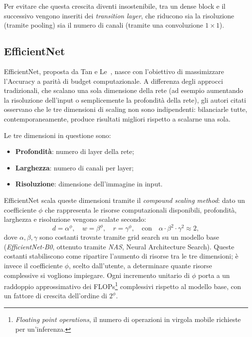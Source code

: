 Per evitare che questa crescita diventi insostenibile, tra un dense block e il successivo vengono inseriti dei \emph{transition layer}, che riducono sia la risoluzione (tramite pooling) sia il numero di canali (tramite una convoluzione $1\times1$).

\clearpage
\subsection{EfficientNet}

EfficientNet, proposta da Tan e Le~\cite{tan2020efficientnetrethinkingmodelscaling}, nasce con l'obiettivo di massimizzare l'Accuracy a parità di budget computazionale. 
A differenza degli approcci tradizionali, che scalano una sola dimensione della rete (ad esempio aumentando la risoluzione dell'input o semplicemente la profondità della rete), 
gli autori citati osservano che le tre dimensioni di scaling non sono indipendenti: bilanciarle tutte, contemporaneamente, produce risultati migliori rispetto a scalarne una sola.

Le tre dimensioni in questione sono:
\begin{itemize}
    \item \textbf{Profondità}: numero di layer della rete;
    \item \textbf{Larghezza}: numero di canali per layer;
    \item \textbf{Risoluzione}: dimensione dell'immagine in input.
\end{itemize}

EfficientNet scala queste dimensioni tramite il \emph{compound scaling method}: dato un coefficiente $\phi$ che rappresenta le risorse computazionali disponibili, profondità, larghezza e risoluzione vengono scalate secondo:
\begin{equation}
    d = \alpha^\phi, \quad w = \beta^\phi, \quad r = \gamma^\phi, \quad \text{con} \quad \alpha \cdot \beta^2 \cdot \gamma^2 \approx 2,
\end{equation}
dove \(\alpha, \beta, \gamma\) sono costanti trovate tramite grid search su un modello base (\emph{EfficientNet-B0}, ottenuto tramite \emph{NAS}, Neural Architecture Search). 
Queste costanti stabiliscono come ripartire l'aumento di risorse tra le tre dimensioni; è invece il coefficiente $\phi$, scelto dall'utente, a determinare quante risorse complessive si vogliono impiegare. 
Ogni incremento unitario di $\phi$ porta a un raddoppio approssimativo dei FLOPs\footnote{\textit{Floating point operations}, il numero di operazioni in virgola mobile richieste per un'inferenza.} complessivi rispetto al modello base, con un fattore di crescita dell'ordine di $2^\phi$.

